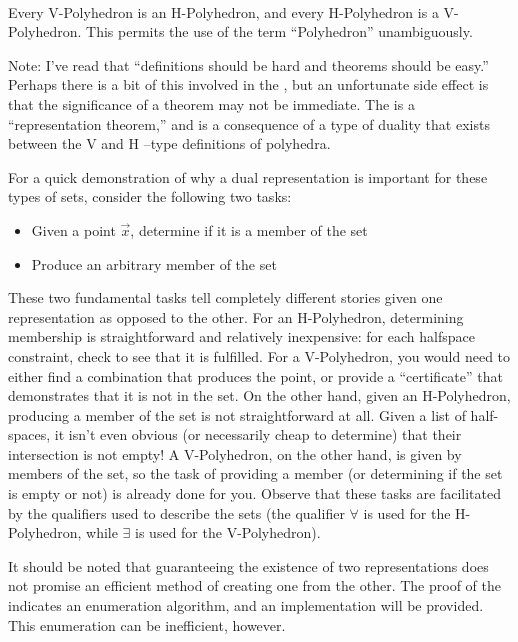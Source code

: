 \documentclass[a4,fleqn]{article}
\begin{document}
\paragraph{\MWT}
Every V-Polyhedron is an H-Polyhedron, and every H-Polyhedron is a V-Polyhedron.  This permits the use of the term ``Polyhedron'' unambiguously.
\medskip

Note:  I've read that ``definitions should be hard and theorems should be easy.''  Perhaps there is a bit of this involved in the \MWT{}, but an unfortunate side effect is that the significance of a theorem may not be immediate.  The \MWT{} is a ``representation theorem,'' and is a consequence of a type of duality that exists between the V and H --type definitions of polyhedra.

For a quick demonstration of why a dual representation is important for these types of sets, consider the following two tasks:
\begin{itemize}
  \item Given a point $\vec{x}$, determine if it is a member of the set
  \item Produce an arbitrary member of the set
\end{itemize}
These two fundamental tasks tell completely different stories given one representation as opposed to the other.  For an H-Polyhedron, determining membership is straightforward and relatively inexpensive: for each halfspace constraint, check to see that it is fulfilled.  For a V-Polyhedron, you would need to either find a combination that produces the point, or provide a ``certificate'' that demonstrates that it is not in the set.  On the other hand, given an H-Polyhedron, producing a member of the set is not straightforward at all.  Given a list of half-spaces, it isn't even obvious (or necessarily cheap to determine) that their intersection is not empty!  A V-Polyhedron, on the other hand, is given by members of the set, so the task of providing a member (or determining if the set is empty or not) is already done for you.  Observe that these tasks are facilitated by the qualifiers used to describe the sets (the qualifier $\forall$ is used for the H-Polyhedron, while $\exists$ is used for the V-Polyhedron).

It should be noted that guaranteeing the existence of two representations does not promise an efficient method of creating one from the other.  The proof of the \MWT{} indicates an enumeration algorithm, and an implementation will be provided.  This enumeration can be inefficient, however.
\end{document}
